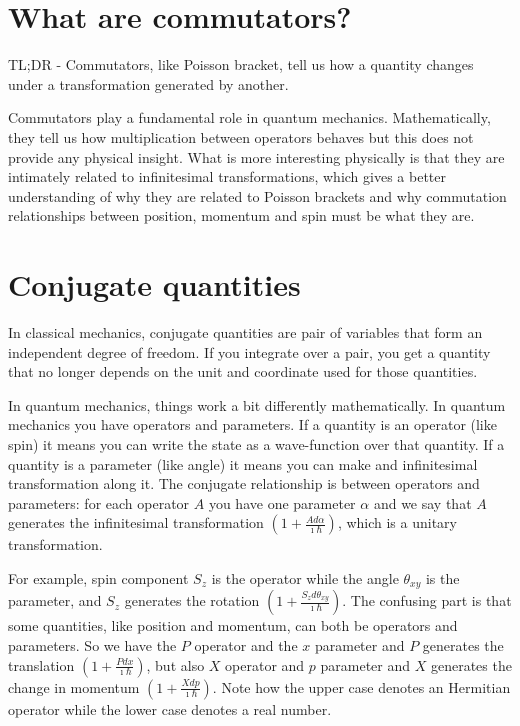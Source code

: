 \documentclass[aps,pra,10pt,floatfix,nofootinbib]{revtex4-1}
\theoremstyle{definition}
\begin{document}
\section{What are commutators?}
TL;DR - Commutators, like Poisson bracket, tell us how a quantity changes under a transformation generated by another.

Commutators play a fundamental role in quantum mechanics. Mathematically, they tell us how multiplication between operators behaves but this does not provide any physical insight. What is more interesting physically is that they are intimately related to infinitesimal transformations, which gives a better understanding of why they are related to Poisson brackets and why commutation relationships between position, momentum and spin must be what they are.

\section{Conjugate quantities}

In classical mechanics, conjugate quantities are pair of variables that form an independent degree of freedom. If you integrate over a pair, you get a quantity that no longer depends on the unit and coordinate used for those quantities.

In quantum mechanics, things work a bit differently mathematically. In quantum mechanics you have operators and parameters. If a quantity is an operator (like spin) it means you can write the state as a wave-function over that quantity. If a quantity is a parameter (like angle) it means you can make and infinitesimal transformation along it. The conjugate relationship is between operators and parameters: for each operator $A$ you have one parameter $\alpha$ and we say that $A$ generates the infinitesimal transformation $(1 + \frac{A d\alpha}{\imath \hbar})$, which is a unitary transformation.

For example, spin component $S_z$ is the operator while the angle $\theta_{xy}$ is the parameter, and $S_z$ generates the rotation $(1 + \frac{S_z d\theta_{xy}}{\imath \hbar})$. The confusing part is that some quantities, like position and momentum, can both be operators and parameters. So we have the $P$ operator and the $x$ parameter and $P$ generates the translation $(1 + \frac{P dx}{\imath \hbar})$, but also $X$ operator and $p$ parameter and $X$ generates the change in momentum $(1 + \frac{X dp}{\imath \hbar})$. Note how the upper case denotes an Hermitian operator while the lower case denotes a real number.
\end{document}

